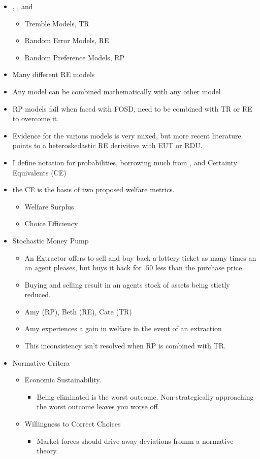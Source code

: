 \documentclass[12pt,a4paper]{article}\usepackage[]{graphicx}\usepackage[]{color}
\begin{document}
\begin{itemize}
	
	\item \textcite{Camerer1994}, \textcite{Hey1994}, and \textcite{Loomes1995}
		\begin{itemize}
			\item Tremble Models, TR
			\item Random Error Models, RE
			\item Random Preference Models, RP
		\end{itemize}
	\item Many different RE models
	\item Any model can be combined mathematically with any other model
	\item RP models fail when faced with FOSD, need to be combined with TR or RE to overcome it.
	\item Evidence for the various models is very mixed, but more recent literature points to a heteroskedastic RE derivitive with EUT or RDU.
	\item I define notation for probabilities, borrowing much from \textcite{Wilcox2008}, and Certainty Equivalents (CE)
	\item the CE is the basis of two proposed welfare metrics.
		\begin{itemize}
			\item Welfare Surplus
			\item Choice Efficiency
		\end{itemize}

	\item Stochastic Money Pump
		\begin{itemize}
			\item An Extractor offers to sell and buy back a lottery ticket as many times an an agent pleases, but buys it back for .50 less than the purchase price.
			\item Buying and selling result in an agents stock of assets being stictly reduced.
			\item Amy (RP), Beth (RE), Cate (TR)
			\item Amy experiences a gain in welfare in the event of an extraction
			\item This inconsistency isn't resolved when RP is combined with TR.
		\end{itemize}
	\item Normative Critera
		\begin{itemize}
			\item Economic Sustainability.
				\begin{itemize}
					\item Being eliminated is the worst outcome. Non-strategically approaching the worst outcome leaves you worse off.
				\end{itemize}
			\item Willingness to Correct Choices
				\begin{itemize}
					\item Market forces should drive away deviations fromm a normative theory.
				\end{itemize}
		\end{itemize}

\end{itemize}
\end{document}

